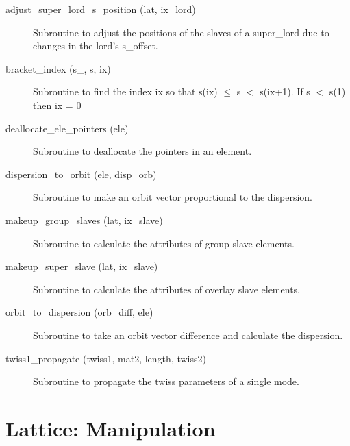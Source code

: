 \begin{description}

\item[adjust_super_lord_s_position (lat, ix_lord)] \Newline
Subroutine to adjust the positions of the slaves of a 
super_lord due to changes in the lord's s_offset. 

\item[bracket_index (s_, s, ix)] \Newline
Subroutine to find the index ix so that s(ix) $\le$ s $<$ s(ix+1). 
If s $<$ s(1) then ix = 0 

\item[deallocate_ele_pointers (ele)] \Newline
Subroutine to deallocate the pointers in an element. 

\item[dispersion_to_orbit (ele, disp_orb)] \Newline
Subroutine to make an orbit vector proportional to the dispersion. 

\item[makeup_group_slaves (lat, ix_slave)] \Newline
Subroutine to calculate the attributes of group slave elements.

\item[makeup_super_slave (lat, ix_slave)] \Newline
Subroutine to calculate the attributes of overlay slave elements. 

\item[orbit_to_dispersion (orb_diff, ele)] \Newline
Subroutine to take an orbit vector difference and calculate the dispersion. 

\item[twiss1_propagate (twiss1, mat2, length, twiss2)] \Newline 
Subroutine to propagate the twiss parameters of a single mode.

\end{description}

\section{Lattice: Manipulation}
\label{r:trans}    

